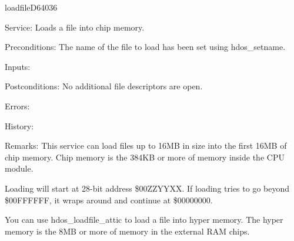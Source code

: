 \newpage
\begin{hyppotrap}{loadfile}{D640}{36}
\item [Service:]
  Loads a file into chip memory.
\item [Preconditions:]
  The name of the file to load has been set using hdos\_setname.
\item [Inputs:]
\item [Postconditions:]
  No additional file descriptors are open.
\item [Errors:]
\item [History:]
\item [Remarks:]
  This service can load files up to 16MB in size into the first 16MB of chip
  memory. Chip memory is the 384KB or more of memory inside the CPU module.

  Loading will start at 28-bit address \$00ZZYYXX. If loading tries to go beyond
  \$00FFFFFF, it wraps around and continue at \$00000000.

  You can use hdos\_loadfile\_attic to load a file into hyper memory. The hyper
  memory is the 8MB or more of memory in the external RAM chips.
\end{hyppotrap}


